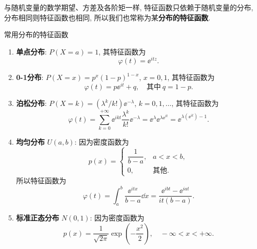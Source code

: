 与随机变量的数学期望、方差及各阶矩一样,
特征函数只依赖于随机变量的分布,
分布相同则特征函数也相同,
所以我们也常称为某\textbf{分布的特征函数}.

\begin{example}{常用分布的特征函数}\label{exam:4.1.1}
    \begin{enumerate}
        \item \textbf{单点分布}: $ P (X = a) = 1 $, 
        其特征函数为
        \begin{equation*}
            \varphi (t) = \ee^{itz}.
        \end{equation*}
        \item \textbf{0-1分布}: $ P( X = x ) = p^x  ( 1 - p )^{1 - x} $, $ x = 0,1 $,
        其特征函数为
        \begin{equation*}
            \varphi (t) = p \ee^{it} + q, \quad \text{其中} \ q= 1 - p.
        \end{equation*}
        \item \textbf{泊松分布}: $ P ( X = k ) = ( \lambda^k/k! ) \ee^{-\lambda} $, $ k = 0, 1, \dotsc $, 其特征函数为
        \begin{equation*}
            \varphi (t) = \sum_{k=0}^{+\infty} \ee^{ikt} \frac{\lambda^k}{k!} \ee^{-\lambda} = \ee^{\lambda} \ee^{\lambda \ee^{it}} = \ee^{\lambda ( \ee^{it} ) -1}.
        \end{equation*}
        \item \textbf{均匀分布} $ U ( a,b ) $: 因为密度函数为
        \begin{equation*}
            p (x) = 
            \begin{cases}
                \dfrac{1}{b-a}, & a < x < b,\\
                0, & \text{其他}.
            \end{cases}
        \end{equation*}
        所以特征函数为
        \begin{equation*}
            \varphi (t) = \int_a^b \frac{\ee^{itx}}{b - a} \dd x = \frac{\ee^{ibt} - \ee^{iat}}{it (b-a)}.
        \end{equation*}
        \item \textbf{标准正态分布} $ N (0,1) $: 因为密度函数为
        \begin{equation*}
            p (x) = \frac{1}{\sqrt{2\pi}} \exp \left( -\frac{x^2}{2} \right), \quad - \infty < x < + \infty.
        \end{equation*}

\end{enumerate}
\end{example}
